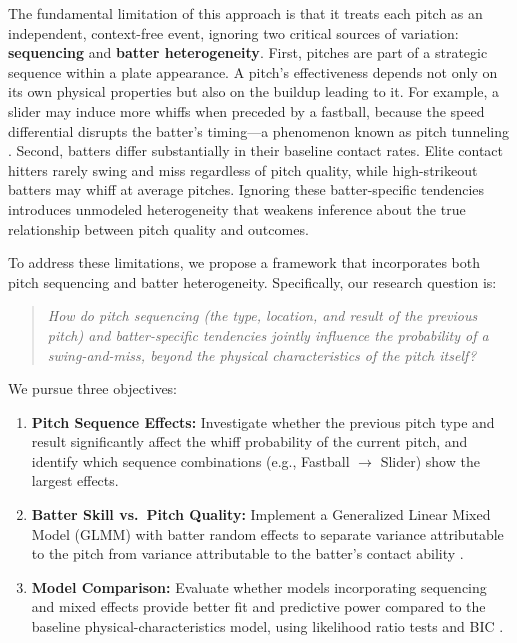 \documentclass[11pt]{article}
\begin{document}
The fundamental limitation of this approach is that it treats each pitch as an independent, context-free event, ignoring two critical sources of variation: \textbf{sequencing} and \textbf{batter heterogeneity}.
First, pitches are part of a strategic sequence within a plate appearance.
A pitch's effectiveness depends not only on its own physical properties but also on the buildup leading to it.
For example, a slider may induce more whiffs when preceded by a fastball, because the speed differential disrupts the batter's timing---a phenomenon known as pitch tunneling \citep{toporek2017tunneling}.
Second, batters differ substantially in their baseline contact rates.
Elite contact hitters rarely swing and miss regardless of pitch quality, while high-strikeout batters may whiff at average pitches.
Ignoring these batter-specific tendencies introduces unmodeled heterogeneity that weakens inference about the true relationship between pitch quality and outcomes.

To address these limitations, we propose a framework that incorporates both pitch sequencing and batter heterogeneity.
Specifically, our research question is:

\begin{quote}
\centering
\textit{How do pitch sequencing (the type, location, and result of the previous pitch) and batter-specific tendencies jointly influence the probability of a swing-and-miss, beyond the physical characteristics of the pitch itself?}
\end{quote}

\noindent
We pursue three objectives:
\begin{enumerate}[leftmargin=3em, label=\textbf{\arabic*.}]
    \item \textbf{Pitch Sequence Effects:} Investigate whether the previous pitch type and result significantly affect the whiff probability of the current pitch, and identify which sequence combinations (e.g., Fastball $\rightarrow$ Slider) show the largest effects.
    \item \textbf{Batter Skill vs.\ Pitch Quality:} Implement a Generalized Linear Mixed Model (GLMM) with batter random effects to separate variance attributable to the pitch from variance attributable to the batter's contact ability \citep{gelman2006data, bolker2009glmm}.
    \item \textbf{Model Comparison:} Evaluate whether models incorporating sequencing and mixed effects provide better fit and predictive power compared to the baseline physical-characteristics model, using likelihood ratio tests and BIC \citep{mccullagh2019generalized}.
\end{enumerate}
\end{document}
